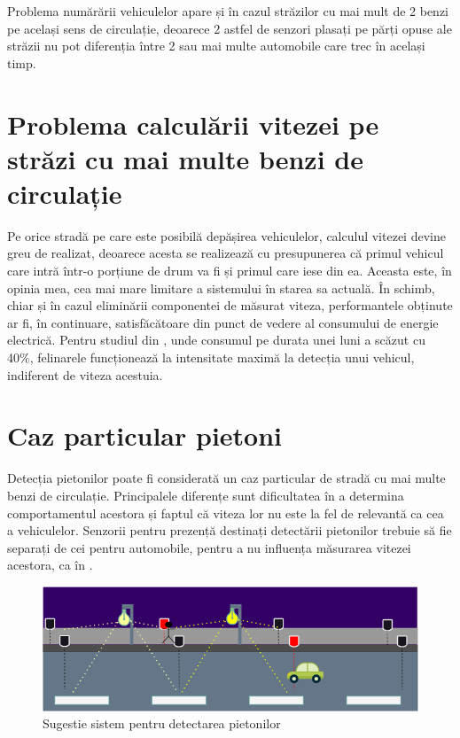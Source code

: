 Problema numărării vehiculelor apare și în cazul străzilor cu mai mult de 2 benzi pe același sens de circulație, deoarece 2 astfel de senzori plasați pe părți opuse ale străzii nu pot diferenția între 2 sau mai multe automobile care trec în același timp. 


\section{Problema calculării vitezei pe străzi cu mai multe benzi de circulație}


Pe orice stradă pe care este posibilă depășirea vehiculelor, calculul vitezei devine greu de realizat, deoarece acesta se realizează cu presupunerea că primul vehicul care intră într-o porțiune de drum va fi și primul care iese din ea. Aceasta este, în opinia mea, cea mai mare limitare a sistemului în starea sa actuală. În schimb, chiar și în cazul eliminării componentei de măsurat viteza, performantele obținute ar fi, în continuare, satisfăcătoare din punct de vedere al consumului de energie electrică. Pentru studiul din \cite{7513906}, unde consumul pe durata unei luni a scăzut cu 40\%, felinarele funcționează la intensitate maximă la detecția unui vehicul, indiferent de viteza acestuia.

 \section{Caz particular pietoni}

Detecția pietonilor poate fi considerată un caz particular de stradă cu mai multe benzi de circulație.  Principalele diferențe sunt dificultatea în a determina comportamentul acestora și faptul că viteza lor nu este la fel de relevantă ca cea a vehiculelor. Senzorii pentru prezență destinați detectării pietonilor trebuie să fie separați de cei pentru automobile, pentru a nu influența măsurarea vitezei acestora, ca în . 
 \begin{figure}[!ht]
    \begin{center}
    \includegraphics[width=0.8\linewidth,keepaspectratio]{pics/ped.png}
    \end{center}
    \caption{Sugestie sistem pentru detectarea pietonilor}
    \label{fig:ped}
\end{figure}

